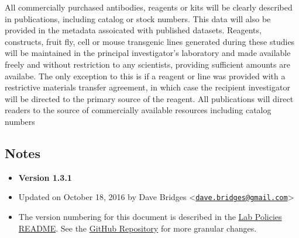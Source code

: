 All commercially purchased antibodies, reagents or kits will be clearly
described in publications, including catalog or stock numbers. This data
will also be provided in the metadata assoicated with published
datasets. Reagents, constructs, fruit fly, cell or mouse transgenic
lines generated during these studies will be maintained in the principal
investigator's laboratory and made available freely and without
restriction to any scientists, providing sufficient amounts are
availabe. The only exception to this is if a reagent or line was
provided with a restrictive materials transfer agreement, in which case
the recipient investigator will be directed to the primary source of the
reagent. All publications will direct readers to the source of
commercially available resources including catalog numbers

\subsection{Notes}\label{notes}

\begin{itemize}
\tightlist
\item
  \textbf{Version 1.3.1}
\item
  Updated on October 18, 2016 by Dave Bridges
  \textless{}\href{mailto:dave.bridges@gmail.com}{\nolinkurl{dave.bridges@gmail.com}}\textgreater{}
\item
  The version numbering for this document is described in the
  \href{https://github.com/BridgesLab/Lab-Documents/blob/master/Lab\%20Policies/README.rst}{Lab
  Policies README}. See the
  \href{https://github.com/BridgesLab/Lab-Documents/blob/master/Lab\%20Policies/data-resource-sharing.rst}{GitHub
  Repository} for more granular changes.
\end{itemize}
